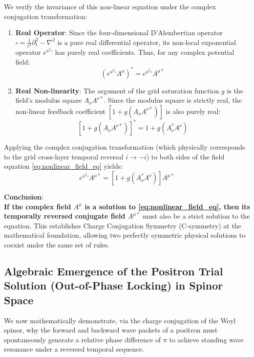 \documentclass[12pt, a4paper]{article}
\begin{document}
We verify the invariance of this non-linear equation under the complex conjugation transformation:
\begin{enumerate}
    \item \textbf{Real Operator}: Since the four-dimensional D'Alembertian operator $\square = \frac{1}{c^2}\partial_t^2 - \nabla^2$ is a pure real differential operator, its non-local exponential operator $e^{a^2 \square}$ has purely real coefficients. Thus, for any complex potential field:
    \begin{equation}
        \left( e^{a^2 \square} A^\mu \right)^* = e^{a^2 \square} A^{\mu *} 
    \end{equation}
    \item \textbf{Real Non-linearity}: The argument of the grid saturation function $g$ is the field's modulus square $A_\nu A^{\nu *}$. Since the modulus square is strictly real, the non-linear feedback coefficient $\left[ 1 + g(A_\nu A^{\nu *}) \right]$ is also purely real:
    \begin{equation}
        \left[ 1 + g(A_\nu A^{\nu *}) \right]^* = 1 + g(A_\nu^* A^\nu) 
    \end{equation}
\end{enumerate}

Applying the complex conjugation transformation (which physically corresponds to the grid cross-layer temporal reversal $i \to -i$) to both sides of the field equation \eqref{eq:nonlinear_field_eq} yields:
\begin{equation}
    e^{a^2 \square} A^{\mu *} = \left[ 1 + g(A_\nu^* A^\nu) \right] A^{\mu *} 
\end{equation}

\textbf{Conclusion}: \\
\textbf{If the complex field $A^\mu$ is a solution to \eqref{eq:nonlinear_field_eq}, then its temporally reversed conjugate field $A^{\mu *}$} must also be a strict solution to the equation. This establishes Charge Conjugation Symmetry (C-symmetry) at the mathematical foundation, allowing two perfectly symmetric physical solutions to coexist under the same set of rules.

\subsection{Algebraic Emergence of the Positron Trial Solution (Out-of-Phase Locking) in Spinor Space}

We now mathematically demonstrate, via the charge conjugation of the Weyl spinor, why the forward and backward wave packets of a positron must spontaneously generate a relative phase difference of $\pi$ to achieve standing wave resonance under a reversed temporal sequence.
\end{document}
